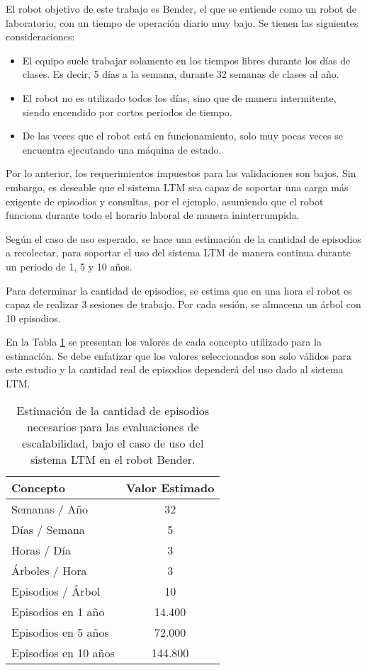 El robot objetivo de este trabajo es Bender, el que se entiende como un robot de laboratorio, con un tiempo de operación diario muy bajo. Se tienen las siguientes consideraciones:
\begin{itemize}
\item El equipo suele trabajar solamente en los tiempos libres durante los días de clases. Es decir, 5 días a la semana, durante 32 semanas de clases al año.
\item El robot no es utilizado todos los días, sino que de manera intermitente, siendo encendido por cortos periodos de tiempo.
\item De las veces que el robot está en funcionamiento, solo muy pocas veces se encuentra ejecutando una máquina de estado.
\end{itemize}

Por lo anterior, los requerimientos impuestos para las validaciones son bajos. Sin embargo, es deseable que el sistema LTM sea capaz de soportar una carga más exigente de episodios y consultas, por el ejemplo, asumiendo que el robot funciona durante todo el horario laboral de manera ininterrumpida.

Según el caso de uso esperado, se hace una estimación de la cantidad de episodios a recolectar, para soportar el uso del sistema LTM de manera continua durante un periodo de 1, 5 y 10 años. 

Para determinar la cantidad de episodios, se estima que en una hora el robot es capaz de realizar 3 sesiones de trabajo. Por cada sesión, se almacena un árbol con 10 episodios. 

En la Tabla \ref{table:escalabilidad} se presentan los valores de cada concepto utilizado para la estimación. Se debe enfatizar que los valores seleccionados son solo válidos para este estudio y la cantidad real de episodios dependerá del uso dado al sistema LTM.

\begin{table}[H]
	\centering
	\begin{tabular}{|l|c|}
		\hline
		\rowcolor{gray!50}
		Concepto & Valor Estimado \\ \hline
		Semanas / Año	&  32 \\  \hline
		Días / Semana	&  5 \\  \hline
		Horas / Día     &  3 \\  \hline
		Árboles / Hora  &  3 \\  \hline
		Episodios / Árbol & 10 \\  \hline \hline
		Episodios en 1 año  & 14.400  \\  \hline 
		Episodios en 5 años  & 72.000  \\  \hline 
		Episodios en 10 años  & 144.800  \\  \hline 		
	\end{tabular} 
	\caption[Estimaciones para validación de escalabilidad]
	{\small Estimación de la cantidad de episodios necesarios para las evaluaciones de escalabilidad, bajo el caso de uso del sistema LTM en el robot Bender.}
	\label{table:escalabilidad}
\end{table}



